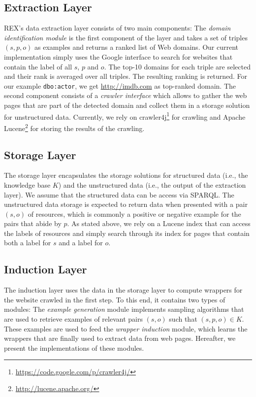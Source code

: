 \subsection{Extraction Layer}
REX's data extraction layer consists of two main components:
The \emph{domain identification module} is the first component of the layer and takes a set of triples $(s, p, o)$ as examples and returns a ranked list of Web domains.
Our current implementation simply uses the Google interface to search for websites that contain the label of all $s$, $p$ and $o$.
The top-10 domains for each triple are selected and their rank is averaged over all triples.
The resulting ranking is returned. 
For our example \texttt{dbo:actor}, we get \url{http://imdb.com} as top-ranked domain.
The second component consists of a \emph{crawler interface} which allows to gather the web pages that are part of the detected domain and collect them in a storage solution for unstructured data.
Currently, we rely on crawler4j\footnote{\url{https://code.google.com/p/crawler4j/}} for crawling and Apache Lucene\footnote{\url{http://lucene.apache.org/}} for storing the results of the crawling.  

\subsection{Storage Layer}
The storage layer encapsulates the storage solutions for structured data (i.e., the knowledge base $K$) and the unstructured data (i.e., the output of the extraction layer). 
We assume that the structured data can be access via SPARQL.
The unstructured data storage is expected to return data when presented with a pair $(s, o)$ of resources, which is commonly a positive or negative example for the pairs that abide by $p$.
As stated above, we rely on a Lucene index that can access the labels of resources and simply search through its index for pages that contain both a label for $s$ and a label for $o$.

\subsection{Induction Layer}
The induction layer uses the data in the storage layer to compute wrappers for the website crawled in the first step.
To this end, it contains two types of modules:
The \emph{example generation} module implements sampling algorithms that are used to retrieve examples of relevant pairs $(s, o)$ such that $(s, p, o) \in K$. 
These examples are used to feed the \emph{wrapper induction} module, which learns the wrappers that are finally used to extract data from web pages.
Hereafter, we present the implementations of these modules.

